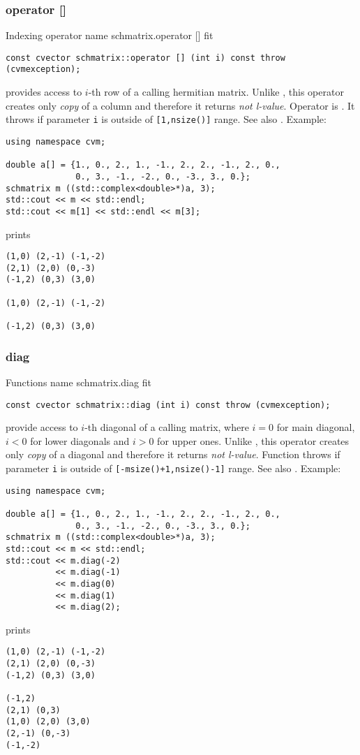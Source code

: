 \subsubsection{operator []}
Indexing operator%
\pdfdest name {schmatrix.operator []} fit
\begin{verbatim}
const cvector schmatrix::operator [] (int i) const throw (cvmexception);
\end{verbatim}
provides access to \hbox{$i$-th} row of a calling hermitian matrix.
Unlike ,
this operator creates only \emph{copy} of a column and therefore
it returns
\emph{not  l-value}.
Operator is \Based.
It throws 
if parameter \verb"i" is outside of \verb"[1,nsize()]" range.
See also .
Example:
\begin{Verbatim}
using namespace cvm;

double a[] = {1., 0., 2., 1., -1., 2., 2., -1., 2., 0.,
              0., 3., -1., -2., 0., -3., 3., 0.};
schmatrix m ((std::complex<double>*)a, 3);
std::cout << m << std::endl;
std::cout << m[1] << std::endl << m[3];
\end{Verbatim}
prints
\begin{Verbatim}
(1,0) (2,-1) (-1,-2)
(2,1) (2,0) (0,-3)
(-1,2) (0,3) (3,0)

(1,0) (2,-1) (-1,-2)

(-1,2) (0,3) (3,0)
\end{Verbatim}
\newpage



\subsubsection{diag}
Functions%
\pdfdest name {schmatrix.diag} fit
\begin{verbatim}
const cvector schmatrix::diag (int i) const throw (cvmexception);
\end{verbatim}
provide access to \hbox{$i$-th} diagonal of a calling matrix,
where $i=0$ for main diagonal, $i<0$ for lower diagonals 
and $i>0$ for upper ones.
Unlike ,
this operator creates only  \emph{copy} of a diagonal and therefore 
it returns \emph{not  l-value}.
Function throws 
if  parameter \verb"i" is outside of 
\verb"[-msize()+1,nsize()-1]" range.
See also .
Example:
\begin{Verbatim}
using namespace cvm;

double a[] = {1., 0., 2., 1., -1., 2., 2., -1., 2., 0.,
              0., 3., -1., -2., 0., -3., 3., 0.};
schmatrix m ((std::complex<double>*)a, 3);
std::cout << m << std::endl;
std::cout << m.diag(-2)
          << m.diag(-1)
          << m.diag(0)
          << m.diag(1)
          << m.diag(2);
\end{Verbatim}
prints
\begin{Verbatim}
(1,0) (2,-1) (-1,-2)
(2,1) (2,0) (0,-3)
(-1,2) (0,3) (3,0)

(-1,2)
(2,1) (0,3)
(1,0) (2,0) (3,0)
(2,-1) (0,-3)
(-1,-2)
\end{Verbatim}
\newpage



